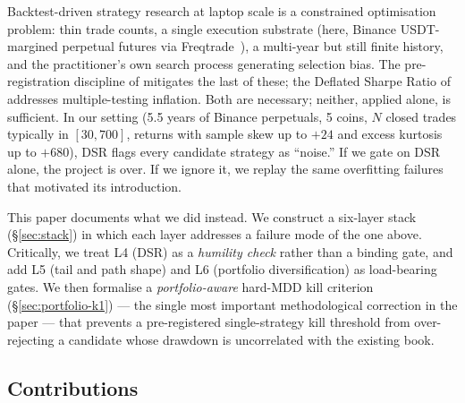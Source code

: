 \documentclass[11pt]{article}
\begin{document}
Backtest-driven strategy research at laptop scale is a constrained
optimisation problem: thin trade counts, a single execution substrate (here,
Binance USDT-margined perpetual futures via Freqtrade~\citep{freqtrade}), a
multi-year but still finite history, and the practitioner's own search
process generating selection bias. The pre-registration discipline of
\citet{bailey2014pbo} mitigates the last of these; the Deflated Sharpe Ratio
of \citet{lopezdeprado2014dsr} addresses multiple-testing inflation. Both are
necessary; neither, applied alone, is sufficient. In our setting (5.5 years
of Binance perpetuals, 5 coins, $N$ closed trades typically in $[30, 700]$,
returns with sample skew up to $+24$ and excess kurtosis up to $+680$), DSR
flags every candidate strategy as ``noise.'' If we gate on DSR alone, the
project is over. If we ignore it, we replay the same overfitting failures
that motivated its introduction.

This paper documents what we did instead. We construct a six-layer stack
(\S\ref{sec:stack}) in which each layer addresses a failure mode of the one
above. Critically, we treat L4 (DSR) as a \emph{humility check} rather than a
binding gate, and add L5 (tail and path shape) and L6 (portfolio
diversification) as load-bearing gates. We then formalise a
\emph{portfolio-aware} hard-MDD kill criterion (\S\ref{sec:portfolio-k1}) ---
the single most important methodological correction in the paper --- that
prevents a pre-registered single-strategy kill threshold from over-rejecting a
candidate whose drawdown is uncorrelated with the existing book.

\subsection{Contributions}
\label{sec:contributions}
\end{document}
